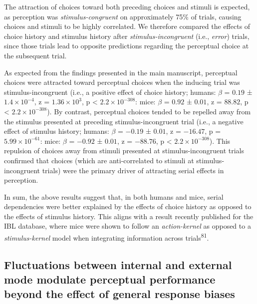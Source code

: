 \documentclass[
]{article}
\begin{document}
The attraction of choices toward both preceding choices and stimuli is
expected, as perception was \emph{stimulus-congruent} on approximately
75\% of trials, causing choices and stimuli to be highly correlated. We
therefore compared the effects of choice history and stimulus history
after \emph{stimulus-incongruent} (i.e., \emph{error}) trials, since
those trials lead to opposite predictions regarding the perceptual
choice at the subsequent trial.

As expected from the findings presented in the main manuscript,
perceptual choices were attracted toward perceptual choices when the
inducing trial was stimulus-incongruent (i.e., a positive effect of
choice history; humans: \(\beta\) = \(0.19\) ±
\(\ensuremath{1.4\times 10^{-4}}\), z =
\(\ensuremath{1.36\times 10^{3}}\), p < \(\ensuremath{2.2\times 10^{-308}}\): mice: \(\beta\) =
\(0.92\) ± \(0.01\), z = \(88.82\), p < \(\ensuremath{2.2\times 10^{-308}}\)). By contrast, perceptual
choices tended to be repelled away from the stimulus presented at
preceding stimulus-incongruent trial (i.e., a negative effect of
stimulus history; humans: \(\beta\) = \(-0.19\) ± \(0.01\), z =
\(-16.47\), p = \(\ensuremath{5.99\times 10^{-61}}\): mice: \(\beta\) =
\(-0.92\) ± \(0.01\), z = \(-88.76\), p < \(\ensuremath{2.2\times 10^{-308}}\)). This repulsion of
choices away from stimuli presented at stimulus-incongruent trials
confirmed that choices (which are anti-correlated to stimuli at
stimulus-incongruent trials) were the primary driver of attracting
serial effects in perception.

In sum, the above results suggest that, in both humans and mice, serial
dependencies were better explained by the effects of choice history as
opposed to the effects of stimulus history. This aligns with a result
recently published for the IBL database, where mice were shown to follow
an \emph{action-kernel} as opposed to a \emph{stimulus-kernel} model
when integrating information across trials\textsuperscript{81}.

\hypertarget{fluctuations-between-internal-and-external-mode-modulate-perceptual-performance-beyond-the-effect-of-general-response-biases}{%
\subsection{Fluctuations between internal and external mode modulate
perceptual performance beyond the effect of general response
biases}\label{fluctuations-between-internal-and-external-mode-modulate-perceptual-performance-beyond-the-effect-of-general-response-biases}}
\end{document}

